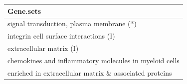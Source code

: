 \begin{tabular}{l}
  \hline
Gene.sets \\ 
  \hline
signal transduction, plasma membrane (*) \\ 
  integrin cell surface interactions (I) \\ 
  extracellular matrix (I) \\ 
  chemokines and inflammatory molecules in myeloid cells \\ 
  enriched in extracellular matrix \& associated proteins \\ 
   \hline
\end{tabular}
